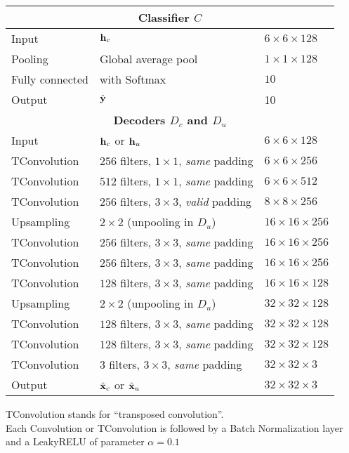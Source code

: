 \documentclass[runningheads]{llncs}
\begin{document}
\begin{table}[htbp]
\begin{threeparttable}
\begin{tabular}{ l l l}
\toprule
\multicolumn{3}{c}{\textbf{Classifier $C$}}\\
\midrule
Input & $\mathbf{h}_c$& $6\times 6\times 128$ \\
Pooling & Global average pool & $1\times 1\times 128$ \\
Fully connected & with Softmax & $10$ \\
Output & $\hat{\mathbf{y}}$ & 10 \\
\toprule
\multicolumn{3}{c}{\textbf{Decoders $D_c$ and $D_u$}}\\
\midrule
Input & $\mathbf{h}_c$ or $\mathbf{h}_u$ & $6\times 6\times 128$ \\
TConvolution & $256$ filters, $1\times1$, \textit{same} padding  & $6\times 6\times 256$ \\
TConvolution & $512$ filters, $1\times1$, \textit{same} padding  & $6\times 6\times 512$ \\
TConvolution & $256$ filters, $3\times3$, \textit{valid} padding  & $8\times 8\times 256$ \\
Upsampling   & $2\times2$ (unpooling in $D_u$)  & $16\times 16\times 256$ \\
TConvolution & $256$ filters, $3\times3$, \textit{same} padding & $16\times 16\times 256$ \\
TConvolution & $256$ filters, $3\times3$, \textit{same} padding & $16\times 16\times 256$ \\
TConvolution & $128$ filters, $3\times3$, \textit{same} padding & $16\times 16\times 128$ \\
Upsampling & $2\times2$ (unpooling in $D_u$) & $32\times 32\times 128$ \\
TConvolution & $128$ filters, $3\times3$, \textit{same} padding  & $32\times 32\times 128$ \\
TConvolution & $128$ filters, $3\times3$, \textit{same} padding  & $32\times 32\times 128$ \\
TConvolution & $3$ filters, $3\times3$, \textit{same} padding  & $32\times 32\times 3$ \\
Output & $\hat{\mathbf{x}}_c$ or $\hat{\mathbf{x}}_u$ & $32\times 32 \times 3$ \\
\bottomrule
\end{tabular}
\begin{tablenotes}
TConvolution stands for ``transposed convolution''.\\ Each Convolution or TConvolution is followed by a Batch Normalization layer and a LeakyRELU of parameter $\alpha = 0.1$
\end{tablenotes}
\end{threeparttable}
\end{table}
\end{document}
